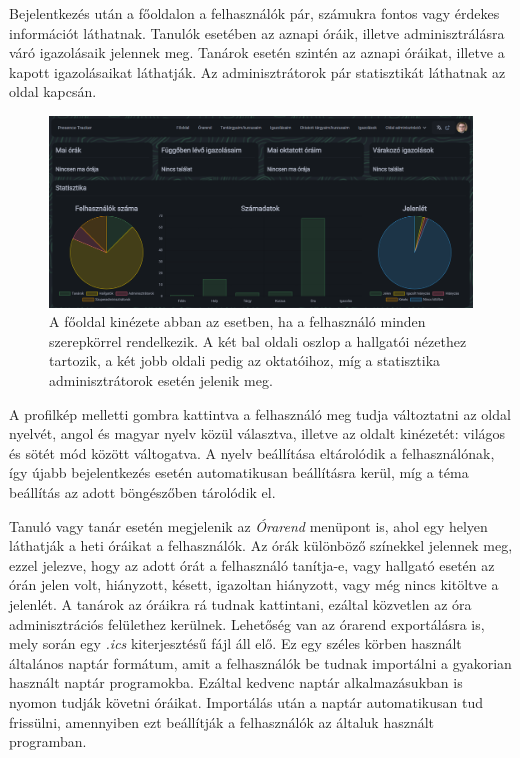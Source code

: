 \documentclass[
]{thesis-ekf}
\theoremstyle{definition}
\theoremstyle{remark}
\begin{document}
Bejelentkezés után a főoldalon a felhasználók pár, számukra fontos vagy érdekes információt láthatnak. Tanulók esetében az aznapi óráik, illetve adminisztrálásra váró igazolásaik jelennek meg. Tanárok esetén szintén az aznapi óráikat, illetve a kapott igazolásaikat láthatják. Az adminisztrátorok pár statisztikát láthatnak az oldal kapcsán.

\begin{figure}[ht!]
	\centering
	\includegraphics[width=15cm]{../pictures/screenshots/landing.png}
	\caption{A főoldal kinézete abban az esetben, ha a felhasználó minden szerepkörrel rendelkezik. A két bal oldali oszlop a hallgatói nézethez tartozik, a két jobb oldali pedig az oktatóihoz, míg a statisztika adminisztrátorok esetén jelenik meg.}
	\label{landing}
\end{figure}

A profilkép melletti gombra kattintva a felhasználó meg tudja változtatni az oldal nyelvét, angol és magyar nyelv közül választva, illetve az oldalt kinézetét: világos és sötét mód között váltogatva. A nyelv beállítása eltárolódik a felhasználónak, így újabb bejelentkezés esetén automatikusan beállításra kerül, míg a téma beállítás az adott böngészőben tárolódik el.

Tanuló vagy tanár esetén megjelenik az \emph{Órarend} menüpont is, ahol egy helyen láthatják a heti óráikat a felhasználók. Az órák különböző színekkel jelennek meg, ezzel jelezve, hogy az adott órát a felhasználó tanítja-e, vagy hallgató esetén az órán jelen volt, hiányzott, késett, igazoltan hiányzott, vagy még nincs kitöltve a jelenlét. A tanárok az óráikra rá tudnak kattintani, ezáltal közvetlen az óra adminisztrációs felülethez kerülnek. Lehetőség van az órarend exportálásra is, mely során egy \emph{.ics} kiterjesztésű fájl áll elő. Ez egy széles körben használt általános naptár formátum, amit a felhasználók be tudnak importálni a gyakorian használt naptár programokba\cite{ICS}. Ezáltal kedvenc naptár alkalmazásukban is nyomon tudják követni óráikat. Importálás után a naptár automatikusan tud frissülni, amennyiben ezt beállítják a felhasználók az általuk használt programban.
\end{document}
